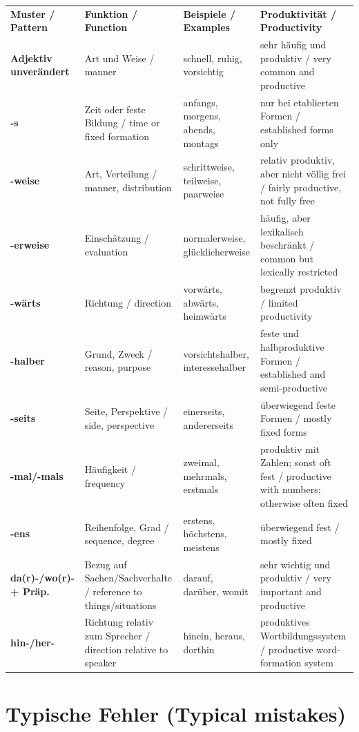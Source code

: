 \documentclass[a4paper,11pt]{article}
\newcommand{\BSection}[2]{\section{#1 \textnormal{\small (#2)}}}
\begin{document}
\begin{longtable}{>{\bfseries}p{2.4cm}|p{3.4cm}|p{4.0cm}|p{4.2cm}}
\rowcolor{HeaderBlueDark}
\color{white}\textbf{Muster / Pattern} & \color{white}\textbf{Funktion / Function} & \color{white}\textbf{Beispiele / Examples} & \color{white}\textbf{Produktivität / Productivity} \\
Adjektiv unverändert & Art und Weise / manner & schnell, ruhig, vorsichtig & sehr häufig und produktiv / very common and productive \\
-s & Zeit oder feste Bildung / time or fixed formation & anfangs, morgens, abends, montags & nur bei etablierten Formen / established forms only \\
-weise & Art, Verteilung / manner, distribution & schrittweise, teilweise, paarweise & relativ produktiv, aber nicht völlig frei / fairly productive, not fully free \\
-erweise & Einschätzung / evaluation & normalerweise, glücklicherweise & häufig, aber lexikalisch beschränkt / common but lexically restricted \\
-wärts & Richtung / direction & vorwärts, abwärts, heimwärts & begrenzt produktiv / limited productivity \\
-halber & Grund, Zweck / reason, purpose & vorsichtshalber, interessehalber & feste und halbproduktive Formen / established and semi-productive \\
-seits & Seite, Perspektive / side, perspective & einerseits, andererseits & überwiegend feste Formen / mostly fixed forms \\
-mal/-mals & Häufigkeit / frequency & zweimal, mehrmals, erstmals & produktiv mit Zahlen; sonst oft fest / productive with numbers; otherwise often fixed \\
-ens & Reihenfolge, Grad / sequence, degree & erstens, höchstens, meistens & überwiegend fest / mostly fixed \\
da(r)-/wo(r)- + Präp. & Bezug auf Sachen/Sachverhalte / reference to things/situations & darauf, darüber, womit & sehr wichtig und produktiv / very important and productive \\
hin-/her- & Richtung relativ zum Sprecher / direction relative to speaker & hinein, heraus, dorthin & produktives Wortbildungssystem / productive word-formation system \\
\end{longtable}

\BSection{Typische Fehler}{Typical mistakes}
\end{document}
